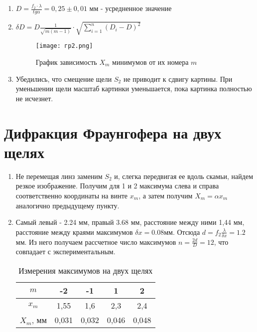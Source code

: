 \documentclass[a4paper]{article}
\begin{document}
\begin{enumerate}
\item $D = \frac{f_2\cdot\lambda}{tg\alpha} = 0,25 \pm 0,01 $ мм - усредненное значение
\item $\delta D = D \frac{1}{\sqrt{m(m - 1)}}\cdot \sqrt{\sum_{i=1}^n (D_i - D)^2}$

	\begin{figure}[H]
		\begin{center}
	\label{graf_b}
	\texttt{[image: гр2.png]}
	\caption{График зависимость $ X_m $ минимумов от их номера $ m $}
		\end{center}
\end{figure}

\item Убедились, что смещение щели $S_2$ не приводит к сдвигу картины. При уменьшении щели масштаб картинки уменьшается, пока картинка полностью не исчезнет.
\end{enumerate}

\section{Дифракция Фраунгофера на двух щелях}

\begin{enumerate}

\item Не перемещая линз заменим $S_2$ и, слегка передвигая ее вдоль скамьи, найдем резкое изображение. Получим для 1 и 2 максимума слева и справа соответственно координаты на винте $ x_m $, а затем получим $ X_m = \alpha x_m $ аналогично предыдущему пункту. 
\item Самый левый - 2.24 мм, правый 3.68 мм, расстояние между ними 1,44 мм, расстояние между краями максимумов $\delta x = 0.08 мм$.
Отсюда $ d = f_2 \frac{\lambda}{\delta x} = 1.2$ мм. Из него получаем рассчетное число максимумов $n = \frac{2d}{D} = 12$, что совпадает с экспериментальным.

 \begin{table}[H]
	\caption{Измерения максимумов на двух щелях}
	\begin{center}
		\begin{tabular}{|c|c|c|c|c|}
			\hline 
			$m$ & -2 & -1 & 1 & 2 \\ 
			\hline 
			$x_m$ & 1,55 & 1,6 & 2,3 & 2,4 \\ 
			\hline 
			$X_m$, мм & 0,031 & 0,032 & 0,046 & 0,048 \\ 
			\hline
	\end{tabular}   
\end{center} 
\end{table}

\end{enumerate}
\end{document}
